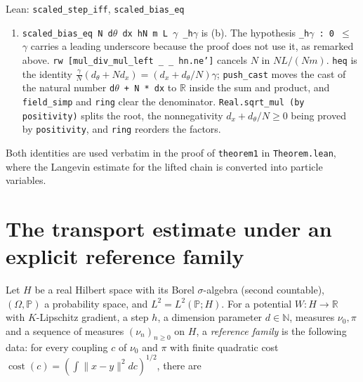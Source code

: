 \documentclass[11pt,a4paper]{article}
\begin{document}
\begin{leanbox}{Lean: \texttt{scaled\_\allowbreak{}step\_\allowbreak{}iff}, \texttt{scaled\_\allowbreak{}bias\_\allowbreak{}eq}}
\begin{enumerate}
\item \texttt{scaled\_\allowbreak{}bias\_\allowbreak{}eq N d\ensuremath{\theta} dx h\allowbreak{}N m L \ensuremath{\gamma} \_\allowbreak{}h\ensuremath{\gamma}} is (b). The hypothesis \texttt{\_\allowbreak{}h\ensuremath{\gamma} : 0 \ensuremath{\le} \ensuremath{\gamma}} carries a leading underscore because the proof does not use it, as remarked above. \texttt{rw [mul\_\allowbreak{}div\_\allowbreak{}mul\_\allowbreak{}left \_\allowbreak{} \_\allowbreak{} hn.\allowbreak{}ne']} cancels \(N\) in \(NL/(Nm)\). \texttt{heq} is the identity \(\frac\gamma N(d_\theta+Nd_x)=(d_x+d_\theta/N)\gamma\); \texttt{push\_\allowbreak{}cast} moves the cast of the natural number \texttt{d\ensuremath{\theta} + N * dx} to \(\mathbb R\) inside the sum and product, and \texttt{field\_\allowbreak{}simp} and \texttt{ring} clear the denominator. \texttt{Real.\allowbreak{}sqrt\_\allowbreak{}mul (by positivity)} splits the root, the nonnegativity \(d_x+d_\theta/N\ge0\) being proved by \texttt{positivity}, and \texttt{ring} reorders the factors.

\end{enumerate}



Both identities are used verbatim in the proof of \texttt{theorem1} in \texttt{Theorem.\allowbreak{}lean}, where the Langevin estimate for the lifted chain is converted into particle variables.
\end{leanbox}

\section{\texorpdfstring{The transport estimate under an explicit reference family}{The transport estimate under an explicit reference family}}


Let \(H\) be a real Hilbert space with its Borel \(\sigma\)-algebra (second countable), \((\Omega,\mathbb P)\) a probability space, and \(L^2=L^2(\mathbb P;H)\). For a potential \(W:H\to\mathbb R\) with \(K\)-Lipschitz gradient, a step \(h\), a dimension parameter \(d\in\mathbb N\), measures \(\nu_0,\pi\) and a sequence of measures \((\nu_n)_{n\ge0}\) on \(H\), a \emph{reference family} is the following data: for every coupling \(c\) of \(\nu_0\) and \(\pi\) with finite quadratic cost \(\operatorname{cost}(c)=(\int\|x-y\|^2dc)^{1/2}\), there are
\end{document}
